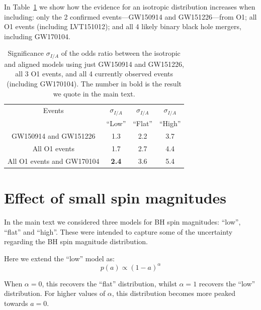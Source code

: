\documentclass{nature}
\begin{document}
\begin{methods}
In Table~\ref{tab:accumulation} we show how the evidence for an isotropic distribution increases when including: only the 2 confirmed events---GW150914 and GW151226---from O1; all O1 events (including LVT151012); and all 4 likely binary black hole mergers, including GW170104. 

\begin{table}
\begin{centering}
\begin{tabular}{ c |  c  |  c  | c  }
  \hline 
  \hline
Events & $\sigma_{I/A}$ &  $\sigma_{I/A}$ & $\sigma_{I/A}$ \\ 
 & ``Low'' & ``Flat'' & ``High'' \\ \hline
GW150914 and GW151226 &  1.3 & 2.2 & 3.7 \\ %
All O1 events & 1.7 & 2.7 & 4.4 \\ %
All O1 events and GW170104 & \textbf{2.4} & 3.6 & 5.4 \\ \hline
\end{tabular}
\caption[]{Significance $\sigma_{I/A}$ of the odds ratio between the isotropic and aligned models using just GW150914 and GW151226, all 3 O1 events, and all 4 currently observed events (including GW170104). The number in bold is the result we quote in the main text.}
\label{tab:accumulation}
\end{centering}
\end{table}


\section{Effect of small spin magnitudes}
\label{sec:smallspins}

In the main text we considered three models for BH spin magnitudes:
``low'', ``flat'' and ``high''. These were intended to capture some of
the uncertainty regarding the BH spin magnitude distribution.

Here we extend the ``low'' model as:
%
\begin{equation}
p(a) \propto (1 - a)^{\alpha}
\label{eq:lowspinalpha}
\end{equation}
%

When $\alpha = 0$, this recovers the ``flat'' distribution, whilst
$\alpha = 1$ recovers the ``low'' distribution. For higher values of
$\alpha$, this distribution becomes more peaked towards
$a = 0$.


\end{methods}
\end{document}

